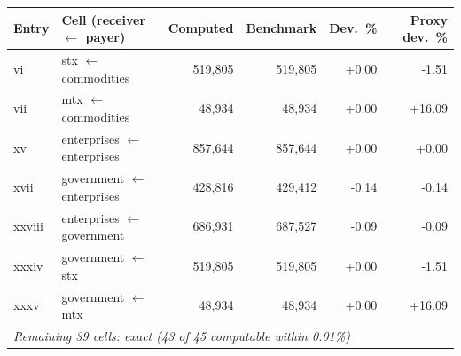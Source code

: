 \begin{tabular}{llrrrr}
\toprule
Entry & Cell (receiver $\leftarrow$ payer) & Computed & Benchmark & Dev.\ \% & Proxy dev.\ \% \\
\midrule
vi & stx $\leftarrow$ commodities & 519,805 & 519,805 & +0.00 & -1.51 \\
vii & mtx $\leftarrow$ commodities & 48,934 & 48,934 & +0.00 & +16.09 \\
xv & enterprises $\leftarrow$ enterprises & 857,644 & 857,644 & +0.00 & +0.00 \\
xvii & government $\leftarrow$ enterprises & 428,816 & 429,412 & -0.14 & -0.14 \\
xxviii & enterprises $\leftarrow$ government & 686,931 & 687,527 & -0.09 & -0.09 \\
xxxiv & government $\leftarrow$ stx & 519,805 & 519,805 & +0.00 & -1.51 \\
xxxv & government $\leftarrow$ mtx & 48,934 & 48,934 & +0.00 & +16.09 \\
\midrule
\multicolumn{6}{l}{\emph{Remaining 39 cells: exact (43 of 45 computable within 0.01\%)}} \\
\bottomrule
\end{tabular}
